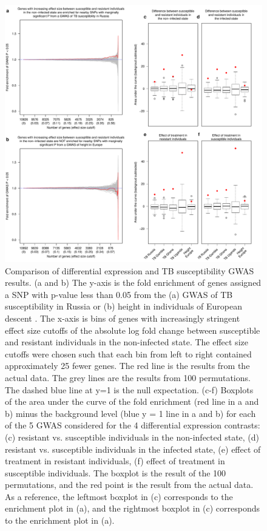 \documentclass[fleqn,10pt]{wlscirep}
\begin{document}
\begin{figure}[p]
\centering
\includegraphics[width=\linewidth]{../figure/gwas-final.pdf}
\caption{
Comparison of differential expression and TB susceptibility GWAS
results. (a and b) The y-axis is the fold enrichment of genes assigned
a SNP with p-value less than 0.05 from the (a) GWAS of TB
susceptibility in Russia \cite{Curtis2015} or (b) height in
individuals of European descent \cite{LangoAllen2010}. The x-axis is
bins of genes with increasingly stringent effect size cutoffs of the
absolute log fold change between susceptible and resistant individuals
in the non-infected state. The effect size cutoffs were chosen such
that each bin from left to right contained approximately 25 fewer
genes. The red line is the results from the actual data. The grey
lines are the results from 100 permutations. The dashed blue line at
y=1 is the null expectation. (c-f) Boxplots of the area under the
curve of the fold enrichment (red line in a and b) minus the
background level (blue y = 1 line in a and b) for each of the 5 GWAS
\cite{Curtis2015, Thye2010, Sobota2016} considered for the 4
differential expression contrasts: (c) resistant vs. susceptible
individuals in the non-infected state, (d) resistant vs. susceptible
individuals in the infected state, (e) effect of treatment in
resistant individuals, (f) effect of treatment in susceptible
individuals. The boxplot is the result of the 100 permutations, and
the red point is the result from the actual data. As a reference, the
leftmost boxplot in (c) corresponds to the enrichment plot in (a), and
the rightmost boxplot in (c) corresponds to the enrichment plot in
(a).
}
\label{fig:gwas}
\end{figure}
\end{document}

